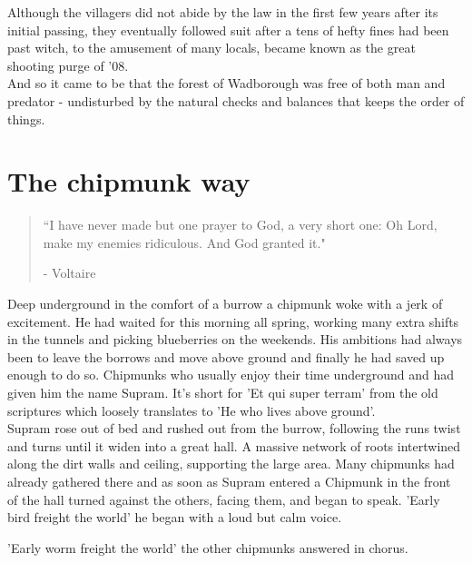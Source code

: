 \documentclass[smalldemyvopaper,11pt,twoside,onecolumn,openright,extrafontsizes]{memoir}
\begin{document}
Although the villagers did not abide by the law in the first few years after its initial passing, they eventually followed suit after a tens of hefty fines had been past witch, to the amusement of many locals, became known as the great shooting purge of '08.\\

And so it came to be that the forest of Wadborough was free of both man and predator - undisturbed by the natural checks and balances that keeps the order of things.

\chapter{The chipmunk way}

\vspace{-1.3cm}
\begin{localsize}{10}
	\begin{quote}
		“I have never made but one prayer to God, a very short one: Oh Lord, make my enemies ridiculous. And God granted it."
		\begin{flushright}- Voltaire \end{flushright}
	\end{quote}
\end{localsize}
\vspace{1cm}

Deep underground in the comfort of a burrow	a chipmunk woke with a jerk of excitement. He had waited for this morning all spring, working many extra shifts in the tunnels and picking blueberries on the weekends. His ambitions had always been to leave the borrows and move above ground and finally he had saved up enough to do so. Chipmunks who usually enjoy their time underground and had given him the name Supram. It's short for 'Et qui super terram' from the old scriptures which loosely translates to 'He who lives above ground'.\\

Supram rose out of bed and rushed out from the burrow, following the runs twist and turns until it widen into a great hall. A massive network of roots intertwined along the dirt walls and ceiling, supporting the large area. Many chipmunks had already gathered there and as soon as Supram entered a Chipmunk in the front of the hall turned against the others, facing them, and began to speak. 
'Early bird freight the world' he began with a loud but calm voice. 

'Early worm freight the world' the other chipmunks answered in chorus.
\end{document}
